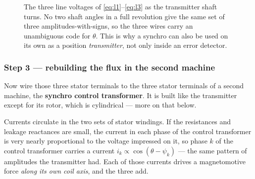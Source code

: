 \documentclass[11pt,a4paper]{article}
\begin{document}
\begin{figure}[H]
\centering
{}
\caption{The three line voltages of \eqref{eq:l1}--\eqref{eq:l3} as the
transmitter shaft turns. No two shaft angles in a full revolution give the
same set of three amplitudes-with-signs, so the three wires carry an
unambiguous code for $\theta$. This is why a synchro can also be used on its
own as a position \emph{transmitter}, not only inside an error detector.}
\label{fig:linev}
\end{figure}

\subsubsection{Step 3 --- rebuilding the flux in the second machine}
\label{sss:rebuild}

Now wire those three stator terminals to the three stator terminals of a
second machine, the \textbf{synchro control transformer}. It is built like the
transmitter except for its rotor, which is cylindrical --- more on that below.

Currents circulate in the two sets of stator windings. If the resistances and
leakage reactances are small, the current in each phase of the control
transformer is very nearly proportional to the voltage impressed on it, so
phase $k$ of the control transformer carries a current
$i_{k}\propto\cos(\theta-\psi_{k})$ --- the same pattern of amplitudes the
transmitter had. Each of those currents drives a magnetomotive force
\emph{along its own coil axis}, and the three add.
\end{document}
